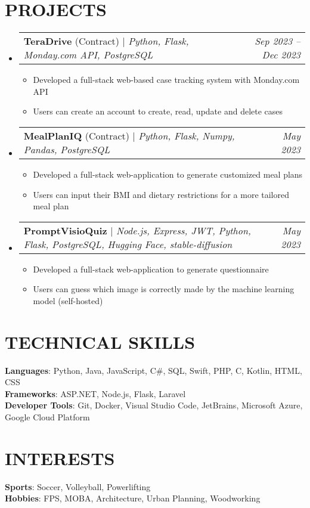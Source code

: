 \documentclass[letterpaper,11pt]{article}
\makeatletter
\newcommand{\resumeItem}[1]{
  \item\small{
    {#1 \vspace{-2pt}}
  }
}
\newcommand{\resumeProjectHeading}[2]{
    \item
    \begin{tabular*}{0.97\textwidth}{l@{\extracolsep{\fill}}r}
      \small#1 & #2 \\
    \end{tabular*}\vspace{-7pt}
}
\newcommand{\resumeSubHeadingListStart}{\begin{itemize}[leftmargin=0.15in, label={}]}
\newcommand{\resumeSubHeadingListEnd}{\end{itemize}}
\newcommand{\resumeItemListStart}{\begin{itemize}}
\newcommand{\resumeItemListEnd}{\end{itemize}\vspace{-5pt}}
\makeatother
\begin{document}
\section{PROJECTS}
    \resumeSubHeadingListStart
      \resumeProjectHeading
          {\textbf{TeraDrive} (Contract) $|$ \emph{Python, Flask, Monday.com API, PostgreSQL}}{\textit{\small{Sep 2023 -- Dec 2023}}}
          \resumeItemListStart
            \resumeItem{Developed a full-stack web-based case tracking system with Monday.com API}
            \resumeItem{Users can create an account to create, read, update and delete cases}
          \resumeItemListEnd
      \resumeProjectHeading
          {\textbf{MealPlanIQ} (Contract) $|$ \emph{Python, Flask, Numpy, Pandas, PostgreSQL}}{\textit{\small{May 2023}}}
          \resumeItemListStart
            \resumeItem{Developed a full-stack web-application to generate customized meal plans}
            \resumeItem{Users can input their BMI and dietary restrictions for a more tailored meal plan}
          \resumeItemListEnd
	  \resumeProjectHeading
		  {\textbf{PromptVisioQuiz} $|$ \emph{Node.js, Express, JWT, Python, Flask, PostgreSQL, Hugging Face, stable-diffusion}}{\textit{\small{May 2023}}}
		  \resumeItemListStart
		    \resumeItem{Developed a full-stack web-application to generate questionnaire}
			\resumeItem{Users can guess which image is correctly made by the machine learning model (self-hosted)}
		\resumeItemListEnd
    \resumeSubHeadingListEnd

\section{TECHNICAL SKILLS}
 \begin{itemize}[leftmargin=0.15in, label={}]
    \small{\item{
     \textbf{Languages}{: Python, Java, JavaScript, C\#, SQL, Swift, PHP, C, Kotlin, HTML, CSS} \\
     \textbf{Frameworks}{: ASP.NET, Node.js, Flask, Laravel} \\
     \textbf{Developer Tools}{: Git, Docker, Visual Studio Code, JetBrains, Microsoft Azure, Google Cloud Platform} \\
    }}
 \end{itemize}

\section{INTERESTS}
 \begin{itemize}[leftmargin=0.15in, label={}]
    \small{\item{
     \textbf{Sports}{: Soccer, Volleyball, Powerlifting} \\
     \textbf{Hobbies}{: FPS, MOBA, Architecture, Urban Planning, Woodworking} \\
    }}
 \end{itemize}

\end{document}
